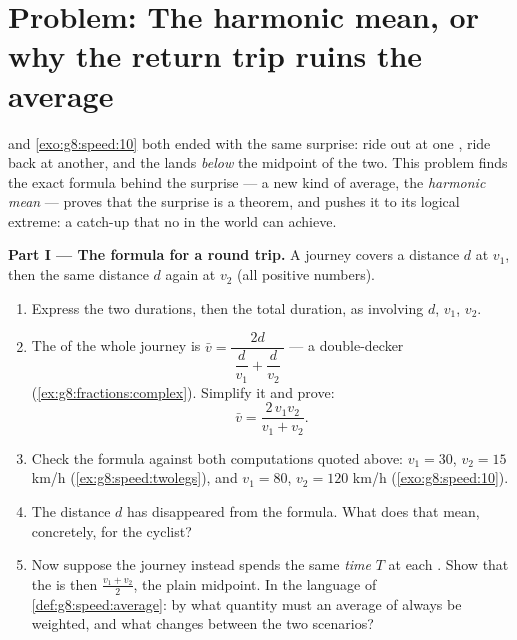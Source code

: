 \section{Problem: The harmonic mean, or why the return trip ruins
the average}

\begin{problem}
\label{pb:g8:speed:1}
 and \cref{exo:g8:speed:10} both ended
with the same surprise: ride out at one , ride back at
another, and the  lands \emph{below} the midpoint of
the two. This problem finds the exact formula behind the surprise
--- a new kind of average, the \emph{harmonic
mean} --- proves that the surprise is a
theorem, and pushes it to its logical extreme: a catch-up that no
 in the world can achieve.

\medskip
\noindent\textbf{Part I --- The formula for a round trip.}
A journey covers a distance $d$ at  $v_1$, then the same
distance $d$ again at  $v_2$ (all positive numbers).
\begin{enumerate}
  \item Express the two durations, then the total duration, as
         involving $d$, $v_1$, $v_2$.
  \item The  of the whole journey is
        $\bar v = \dfrac{2d}{\ \dfrac{d}{v_1} + \dfrac{d}{v_2}\ }$
        --- a double-decker 
        (\cref{ex:g8:fractions:complex}). Simplify it and prove:
        \[
        \bar v = \frac{2\, v_1 v_2}{v_1 + v_2} .
        \]
  \item Check the formula against both computations quoted above:
        $v_1 = 30$, $v_2 = 15$ km/h
        (\cref{ex:g8:speed:twolegs}), and $v_1 = 80$,
        $v_2 = 120$ km/h (\cref{exo:g8:speed:10}).
  \item The distance $d$ has disappeared from the formula. What
        does that mean, concretely, for the cyclist?
  \item Now suppose the journey instead spends the same
        \emph{time} $T$ at each . Show that the  is then $\frac{v_1 + v_2}{2}$, the plain midpoint.
        In the language of \cref{def:g8:speed:average}: by what
        quantity must an average of  always be weighted,
        and what changes between the two scenarios?
\end{enumerate}


\end{problem}
